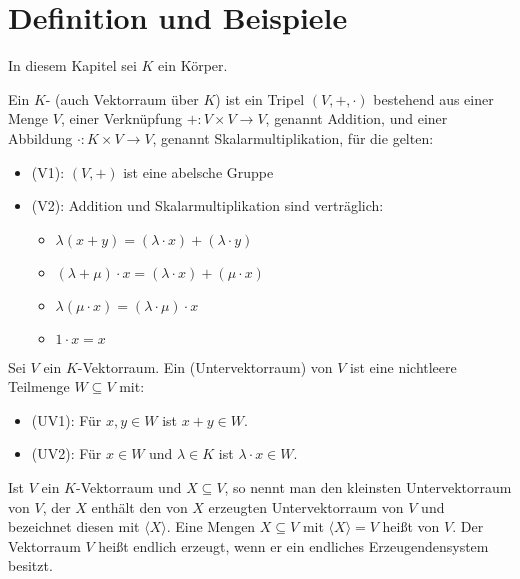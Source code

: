 \section{Definition und Beispiele}

In diesem Kapitel sei $K$ ein Körper.

\begin{definition}[Vektorraum]
	Ein $K$- (auch Vektorraum über $K$) ist ein Tripel $(V,+,\cdot)$ 
	bestehend aus einer Menge $V$, einer Verknüpfung $+: V \times V \to V$, genannt Addition, und einer Abbildung 
	$\cdot: K \times V \to V$, genannt Skalarmultiplikation, für die gelten:
	\begin{itemize}
		\item (V1): $(V,+)$ ist eine abelsche Gruppe
		\item (V2): Addition und Skalarmultiplikation sind verträglich:
		\begin{itemize}
			\item $\lambda(x+y)=(\lambda\cdot x)+(\lambda\cdot y)$
			\item $(\lambda+\mu)\cdot x = (\lambda\cdot x)+(\mu\cdot x)$
			\item $\lambda(\mu\cdot x)=(\lambda\cdot\mu)\cdot x$
			\item $1\cdot x = x$
		\end{itemize}
	\end{itemize}
\end{definition}

\begin{definition}[Untervektorraum]
	Sei $V$ ein $K$-Vektorraum. Ein  (Untervektorraum) von $V$ ist eine nichtleere
	Teilmenge $W \subseteq V$ mit:
	\begin{itemize}
		\item (UV1): Für $x,y \in W$ ist $x+y\in W$.
		\item (UV2): Für $x \in W$ und $\lambda \in K$ ist $\lambda\cdot x\in W$.
	\end{itemize}
	
\end{definition}

\begin{definition}[Erzeugendensystem]
	Ist $V$ ein $K$-Vektorraum und $X\subseteq V$, so nennt man den kleinsten Untervektorraum von 
	$V$, der $X$ enthält den von $X$ erzeugten Untervektorraum von $V$ und bezeichnet diesen mit $\langle X\rangle$. Eine Mengen $X\subseteq V$ 
	mit $\langle X\rangle=V$ heißt  von $V$. Der Vektorraum $V$ heißt endlich erzeugt, wenn er ein endliches Erzeugendensystem 
	besitzt.
\end{definition}